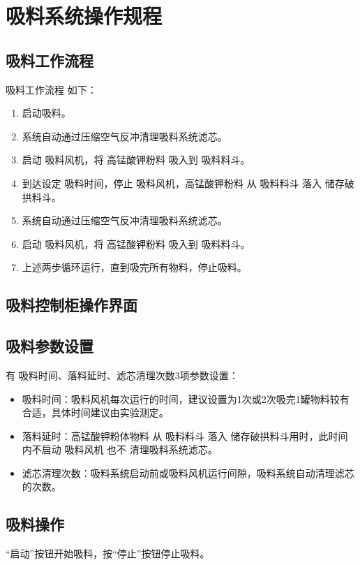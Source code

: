 \documentclass[UTF8,a4paper,12pt,titlepage]{ctexart}
\begin{document}
\section{吸料系统操作规程}
   \subsection{吸料工作流程}
   吸料工作流程 如下：
   \begin{enumerate}
       \item 启动吸料。
       \item 系统自动通过压缩空气反冲清理吸料系统滤芯。
       \item 启动 吸料风机，将 高锰酸钾粉料 吸入到 吸料料斗。
       \item 到达设定 吸料时间，停止 吸料风机，高锰酸钾粉料 从 吸料料斗 落入 储存破拱料斗。
       \item 系统自动通过压缩空气反冲清理吸料系统滤芯。
       \item 启动 吸料风机，将 高锰酸钾粉料 吸入到 吸料料斗。
       \item 上述两步循环运行，直到吸完所有物料，停止吸料。
   \end{enumerate}

   \newpage

   \subsection{吸料控制柜操作界面}
   

   \subsection{吸料参数设置}
   
    有 吸料时间、落料延时、滤芯清理次数3项参数设置：
   \begin{itemize}
       \item 吸料时间：吸料风机每次运行的时间，建议设置为1次或2次吸完1罐物料较有合适，具体时间建议由实验测定。
       \item 落料延时：高锰酸钾粉体物料 从 吸料料斗 落入 储存破拱料斗用时，此时间内不启动 吸料风机 也不 清理吸料系统滤芯。
       \item 滤芯清理次数：吸料系统启动前或吸料风机运行间隙，吸料系统自动清理滤芯的次数。
   \end{itemize}

   \newpage

   \subsection{吸料操作}
   
   “启动”按钮开始吸料，按“停止”按钮停止吸料。 
\end{document}
